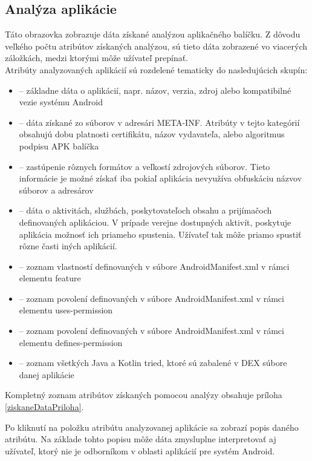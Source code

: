 \subsection{Analýza aplikácie}
Táto obrazovka zobrazuje dáta získané analýzou aplikačného balíčku. Z dôvodu veľkého počtu atribútov získaných analýzou, sú tieto dáta zobrazené vo viacerých záložkách, medzi ktorými môže užívateľ prepínať. 
\\
\noindent Atribúty analyzovaných aplikácií sú rozdelené tematicky do nasledujúcich skupín:
\begin{itemize}
	\item {} -- základne dáta o aplikácií, napr. názov, verzia, zdroj alebo kompatibilné vezie systému Android
	\item {} -- dáta získané zo súborov v adresári META-INF. Atribúty v tejto kategórií obsahujú dobu platnosti certifikátu, názov vydavateľa, alebo algoritmus podpisu APK balíčka
	\item {} -- zastúpenie rôznych formátov a veľkostí zdrojových súborov. Tieto informácie je možné získať iba pokiaľ aplikácia nevyužíva obfuskáciu názvov súborov a adresárov
	\item {} -- dáta o aktivitách, službách, poskytovateľoch obsahu a prijímačoch definovaných aplikáciou. V prípade verejne dostupných aktivít, poskytuje aplikácia možnosť ich priameho spustenia. Užívateľ tak môže priamo spustiť rôzne časti iných aplikácií.
	\item {} -- zoznam vlastností definovaných v súbore AndroidManifest.xml v rámci elementu feature
	\item {} -- zoznam povolení definovaných v súbore AndroidManifest.xml v rámci elementu uses-permission
	\item {} -- zoznam povolení definovaných v súbore AndroidManifest.xml v rámci elementu defines-permission
	\item {} -- zoznam všetkých Java a Kotlin tried, ktoré sú zabalené v DEX súbore danej aplikácie
\end{itemize}
Kompletný zoznam atribútov získaných pomocou analýzy obsahuje príloha \ref{ziskaneDataPriloha}. 

Po kliknutí na položku atribútu analyzovanej aplikácie sa zobrazí popis daného atribútu. Na základe tohto popisu môže dáta zmysluplne interpretovať aj užívateľ, ktorý nie je odborníkom v oblasti aplikácií pre systém Android.

